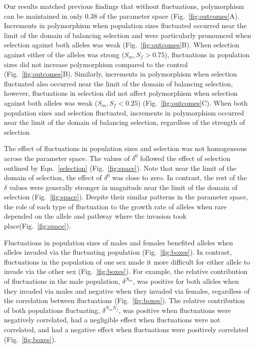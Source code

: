 \documentclass[12pt]{article}
\begin{document}
Our results matched previous findings that without fluctuations, polymorphism can be maintained in only $ 0.38$ of the parameter space (Fig.~\ref{fig:outcomes}A). Increments in polymorphism when population sizes fluctuated occurred near the limit of the domain of balancing selection and were particularly pronounced when selection against both alleles was weak (Fig.~\ref{fig:outcomes}B). When selection against either of the alleles was strong ($ S_{m}, S_{f}> 0.75 $), fluctuations in population sizes did not increase polymorphism compared to the control (Fig.~\ref{fig:outcomes}B). Similarly, increments in polymorphism when selection fluctuated also occurred near the limit of the domain of balancing selection, however, fluctuations in selection did not affect polymorphism when selection against both alleles was weak ($ S_{m}, S_{f}< 0.25 $) (Fig.~\ref{fig:outcomes}C). When both population sizes and selection fluctuated, increments in polymorphism occurred near the limit of the domain of balancing selection, regardless of the strength of selection

The effect of fluctuations in population sizes and selection was not homogeneous across the parameter space. The values of $\delta^{0}$ followed the effect of selection outlined by Eqn.~\ref{selection} (Fig.~\ref{fig:space}). Note that near the limit of the domain of selection, the effect of $\delta^{0}$ was close to zero. In contrast, the rest of the $\delta$ values were generally stronger in magnitude near the limit of the domain of selection  (Fig.~\ref{fig:space}). Despite their similar patterns in the parameter space, the role of each type of fluctuation to the growth rate of alleles when rare depended on the allele and pathway where the invasion took place(Fig.~\ref{fig:space}).

Fluctuations in population sizes of males and females benefited alleles when alleles invaded via the fluctuating population (Fig.~\ref{fig:boxes}). In contrast, fluctuations in the population of one sex made it more difficult for either allele to invade via the other sex (Fig.~\ref{fig:boxes}). For example, the relative contribution of fluctuations in the male population, $\delta^{N_{m}}$, was positive for both alleles when they invaded via males and negative when they invaded via females, regardless of the correlation between fluctuations (Fig.~\ref{fig:boxes}). The relative contribution of both populations fluctuating,  $\delta^{N_{m}N_{f}}$, was positive when fluctuations were negatively correlated, had a negligible effect when fluctuations were not correlated, and had a negative effect when fluctuations were positively correlated (Fig.~\ref{fig:boxes}).
\end{document}
